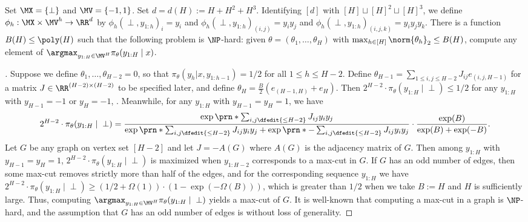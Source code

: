 \begin{proposition}\label{prop:softmax-np-hardness}
  Set $\MX = \{\perp\}$ and $\MV = \{-1,1\}$. Set $d = d(H) := H+H^2+H^3$. Identifying $[d]$ with $[H] \sqcup [H]^2 \sqcup [H]^3$, we define $\phi_h: \MX \times \MV^h \to \RR^d$ by $\phi_h(\perp,y_{1:h})_i = y_i$ and $\phi_h(\perp,y_{1:h})_{(i,j)} = y_iy_j$ and $\phi_h(\perp,y_{1:h})_{(i,j,k)} = y_iy_jy_k$. There is a function $B(H) \leq \poly(H)$ such that the following problem is $\NP$-hard: given $\theta = (\theta_1,\dots,\theta_H)$ with $\max_{h \in [H]} \norm{\theta_h}_2 \leq B(H)$, compute any element of $\argmax_{y_{1:H} \in \MV^H} \pi_\theta(y_{1:H}\mid{} x)$.
\end{proposition}
\begin{proof}[] Suppose we define $\theta_1,\dots,\theta_{H-2} = 0$, so that $\pi_\theta(y_h|x,y_{1:h-1}) = 1/2$ for all $1 \leq h \leq H-2$. Define $\theta_{H-1} = \sum_{1 \leq i,j \leq H-2} J_{ij} e_{(i,j,H-1)}$ for a matrix $J \in \RR^{(H-2)\times(H-2)}$ to be specified later, and define $\theta_H = \frac{B}{2} (e_{(H-1,H)} + e_H)$. Then $2^{H-2}\cdot \pi_\theta(y_{1:H}\mid{} \perp) \leq 1/2$ for any $y_{1:H}$ with $y_{H-1} = -1$ or $y_H = -1$, . Meanwhile, for any $y_{1:H}$ with $y_{H-1} = y_H = 1$, we have\loose
\[2^{H-2}\cdot\pi_\theta(y_{1:H}\mid{} \perp) = \frac{\exp\prn*{\sum_{i,j\dfedit{\leq{}H-2}} J_{ij}y_iy_j}}{\exp\prn*{\sum_{i,j\dfedit{\leq{}H-2}}J_{ij}y_iy_j} + \exp\prn*{-\sum_{i,j\dfedit{\leq{}H-2}} J_{ij}y_iy_j}} \cdot \frac{\exp(B)}{\exp(B)+\exp(-B)}.\]
Let $G$ be any graph on vertex set $[H-2]$ and let $J = -A(G)$ where $A(G)$ is the adjacency matrix of $G$. Then among $y_{1:H}$ with $y_{H-1} = y_H = 1$, $2^{H-2}\cdot\pi_\theta(y_{1:H}\mid{} \perp)$ is maximized when $y_{1:H-2}$ corresponds to a max-cut in $G$. If $G$ has an odd number of edges, then some max-cut removes strictly more than
half of the edges, and for the corresponding sequence $y_{1:H}$ we have $2^{H-2}\cdot\pi_\theta(y_{1:H}\mid{} \perp) \geq (1/2+\Omega(1)) \cdot (1 - \exp(-\Omega(B)))$, which is greater than $1/2$ when we take $B := H$ and $H$ is sufficiently large. Thus, computing $\argmax_{y_{1:H} \in \MV^H} \pi_\theta(y_{1:H}\mid{} \perp)$ yields a max-cut of $G$. It is well-known that computing a max-cut in a graph is $\NP$-hard, and the assumption that $G$ has an odd number of edges is without loss of generality.
\end{proof}



